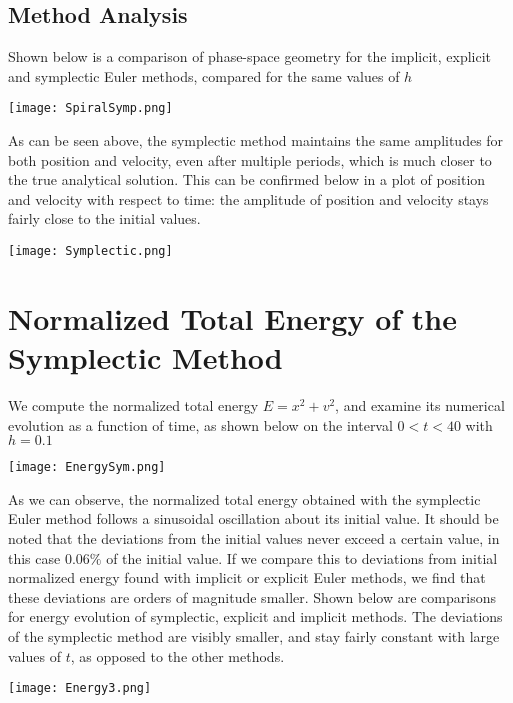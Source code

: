\documentclass{scrartcl}
\begin{document}
\subsection{Method Analysis}
Shown below is a comparison of phase-space geometry for the implicit, explicit and symplectic Euler methods, compared for the same values of $h$
\begin{center}
\texttt{[image: SpiralSymp.png]}
\end{center}
As can be seen above, the symplectic method maintains the same amplitudes for both position and velocity, even after multiple periods, which is much closer to the true analytical solution. This can be confirmed below in a plot of position and velocity with respect to time: the amplitude of position and velocity stays fairly close to the initial values.
\begin{center}
\texttt{[image: Symplectic.png]}
\end{center}
\section{Normalized Total Energy of the Symplectic Method}
We compute the normalized total energy $E = x^2 + v^2$, and examine its numerical evolution as a function of time, as shown below on the interval $0<t<40$ with $h=0.1$
\begin{center}
\texttt{[image: EnergySym.png]}
\end{center}
As we can observe, the normalized total energy obtained with the symplectic Euler method follows a sinusoidal oscillation about its initial value. It should be noted that the deviations from the initial values never exceed a certain value, in this case $0.06 \%$ of the initial value. If we compare this to deviations from initial normalized energy found with implicit or explicit Euler methods, we find that these deviations are orders of magnitude smaller. Shown below are comparisons for energy evolution of symplectic, explicit and implicit methods. The deviations of the symplectic method are visibly smaller, and stay fairly constant with large values of $t$, as opposed to the other methods.
\begin{center}
\texttt{[image: Energy3.png]}
\end{center}
\end{document}
